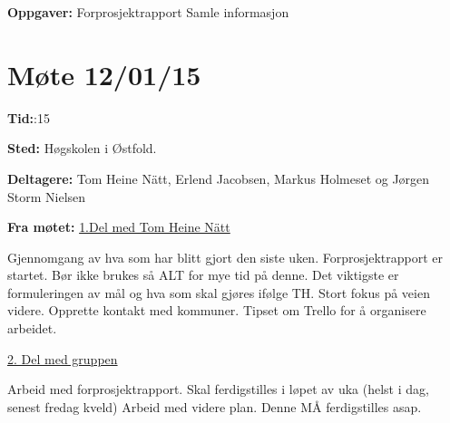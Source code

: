 \vspace{20pt}

\hspace{-17pt}\textbf{Oppgaver:}\newline
Forprosjektrapport \newline
Samle informasjon\newline

\newpage


\section{Møte 12/01/15}

\vspace{30pt}
\textbf{Tid:}:15\newline

\hspace{-17pt}\textbf{Sted:}\newline 
Høgskolen i Østfold.\newline

\hspace{-17pt}\textbf{Deltagere:}\newline 
Tom Heine Nätt, Erlend Jacobsen, Markus Holmeset og Jørgen Storm Nielsen\newline

\hspace{-17pt}\textbf{Fra møtet:}\newline
\underline{1.Del med Tom Heine Nätt}\newline

\hspace{-17pt}Gjennomgang av hva som har blitt gjort den siste uken. Forprosjektrapport er startet. Bør ikke brukes så ALT for mye tid på denne. Det viktigste er formuleringen av mål og hva som skal gjøres ifølge TH.\newline 
Stort fokus på veien videre. Opprette kontakt med kommuner. \newline
Tipset om Trello for å organisere arbeidet. \newline

\underline{2. Del med gruppen} \newline

\hspace{-17pt}Arbeid med forprosjektrapport. Skal ferdigstilles i løpet av uka (helst i dag, senest fredag kveld)\newline
Arbeid med videre plan. Denne MÅ ferdigstilles asap. \newline

